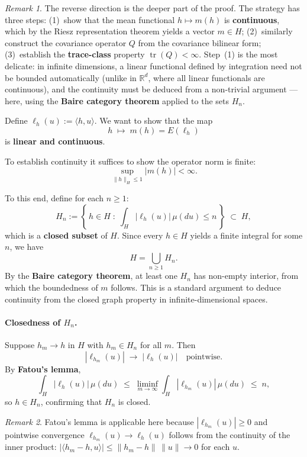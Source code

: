 \documentclass[11pt]{article}
\theoremstyle{definition}
\theoremstyle{remark}
\newtheorem{remark}{Remark}
\DeclareMathOperator{\tr}{tr}
\begin{document}
\begin{remark}
The reverse direction is the deeper part of the proof.  The strategy has three steps:
(1)~show that the mean functional $h \mapsto m(h)$ is \textbf{continuous}, which by the Riesz representation theorem yields a vector $m \in H$;
(2)~similarly construct the covariance operator $Q$ from the covariance bilinear form;
(3)~establish the \textbf{trace-class} property $\tr(Q) < \infty$.
Step~(1) is the most delicate: in infinite dimensions, a linear functional defined by integration need not be bounded automatically (unlike in $\mathbb{R}^d$, where all linear functionals are continuous), and the continuity must be deduced from a non-trivial argument --- here, using the \textbf{Baire category theorem} applied to the sets $H_n$.
\end{remark}

Define $\ell_h(u) := \langle h, u \rangle$.  We want to show that the map
\[
    h \;\longmapsto\; m(h) = E(\ell_h)
\]
is \textbf{linear and continuous}.

To establish continuity it suffices to show the operator norm is finite:
\[
    \sup_{\|h\|_H \le 1} |m(h)| < \infty.
\]

To this end, define for each $n \ge 1$:
\[
    H_n := \left\{\, h \in H \;:\; \int_H |\ell_h(u)|\, \mu(du) \le n \,\right\}
    \;\subset\; H,
\]
which is a \textbf{closed subset} of $H$.  Since every $h \in H$ yields
a finite integral for some $n$, we have
\[
    H = \bigcup_{n \ge 1} H_n.
\]
By the \textbf{Baire category theorem}, at least one $H_n$ has non-empty interior, from which the boundedness of $m$ follows. This is a standard argument to deduce continuity from the closed graph property in infinite-dimensional spaces.

\paragraph{Closedness of $H_n$.}
Suppose $h_m \to h$ in $H$ with $h_m \in H_n$ for all $m$.  Then
\[
    |\ell_{h_m}(u)| \;\longrightarrow\; |\ell_h(u)| \quad \text{pointwise}.
\]
By \textbf{Fatou's lemma},
\[
    \int_H |\ell_h(u)|\,\mu(du)
    \;\le\; \liminf_{m \to \infty} \int_H |\ell_{h_m}(u)|\,\mu(du)
    \;\le\; n,
\]
so $h \in H_n$, confirming that $H_n$ is closed.

\begin{remark}
Fatou's lemma is applicable here because $|\ell_{h_m}(u)| \ge 0$ and pointwise convergence $\ell_{h_m}(u) \to \ell_h(u)$ follows from the continuity of the inner product: $|\langle h_m - h, u\rangle| \le \|h_m - h\|\,\|u\| \to 0$ for each $u$.
\end{remark}
\end{document}
